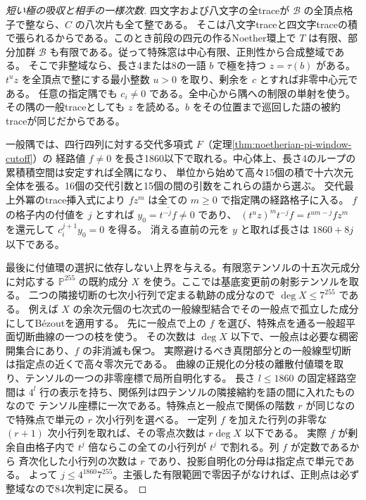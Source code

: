 \begin{proof}[短い極の吸収と相手の一様次数]
四文字および八文字の全traceが $\mathcal B$ の全頂点格子で整なら、$C$ の八次片も全て整である。
そこは八文字traceと四文字traceの積で張られるからである。このとき前段の四元の作るNoether環上で
$T$ は有限、部分加群 $\mathcal B$ も有限である。従って特殊窓は中心有限、正則性から合成整域である。
そこで非整域なら、長さ4または8の一語 $b$ で極を持つ $z=\tau(b)$ がある。
$t^u z$ を全頂点で整にする最小整数 $u>0$ を取り、剰余を $c$ とすれば非零中心元である。
任意の指定隅でも $c_i\ne0$ である。全中心から隅への制限の単射を使う。
その隅の一般traceとしても $z$ を読める。$b$ をその位置まで巡回した語の被約traceが同じだからである。

一般隅では、四行四列に対する交代多項式 $F$（定理\ref{thm:noetherian-pi-window-cutoff}）の
経路値 $f\ne0$ を長さ1860以下で取れる。中心体上、長さ4のループの累積積空間は安定すれば全隅になり、
単位から始めて高々15個の積で十六次元全体を張る。16個の交代引数と15個の間の引数をこれらの語から選ぶ。
交代最上外冪のtrace挿入式により $f z^m$ は全ての $m\ge0$ で指定隅の経路格子に入る。
$f$ の格子内の付値を $j$ とすれば $y_0=\overline{t^{-j}f}\ne0$ であり、
$(t^uz)^m t^{-j}f=t^{um-j}f z^m$ を還元して $c_i^{j+1} y_0=0$ を得る。
消える直前の元を $y$ と取れば長さは $1860+8j$ 以下である。

最後に付値環の選択に依存しない上界を与える。有限窓テンソルの十五次元成分に対応する
$\mathbb P^{255}$ の既約成分 $X$ を使う。ここでは基底変更前の射影テンソルを取る。
二つの隣接切断の七次小行列で定まる軌跡の成分なので $\deg X\le7^{255}$ である。
例えば $X$ の余次元個の七次式の一般線型結合でその一般点で孤立した成分にしてBézoutを適用する。
先に一般点で上の $f$ を選び、特殊点を通る一般超平面切断曲線の一つの枝を使う。
その次数は $\deg X$ 以下で、一般点は必要な稠密開集合にあり、$f$ の非消滅も保つ。
実際避けるべき真閉部分との一般線型切断は指定点の近くで高々零次元である。
曲線の正規化の分枝の離散付値環を取り、テンソルの一つの非零座標で局所自明化する。
長さ $l\le1860$ の固定経路空間は $4^l$ 行の表示を持ち、関係列は四テンソルの隣接縮約を語の間に入れたものなので
テンソル座標に一次である。特殊点と一般点で関係の階数 $r$ が同じなので特殊点で単元の $r$ 次小行列を選べる。
一定列 $f$ を加えた行列の非零な $(r+1)$ 次小行列を取れば、その零点次数は $r\deg X$ 以下である。
実際 $f$ が剰余自由格子内で $t^j$ 倍ならこの全ての小行列が $t^j$ で割れる。列 $f$ が定数であるから
斉次化した小行列の次数は $r$ であり、投影自明化の分母は指定点で単元である。
よって $j\le4^{1860}7^{255}$。主張した有限範囲で零因子がなければ、正則点は必ず整域なので84次判定に戻る。
\end{proof}
